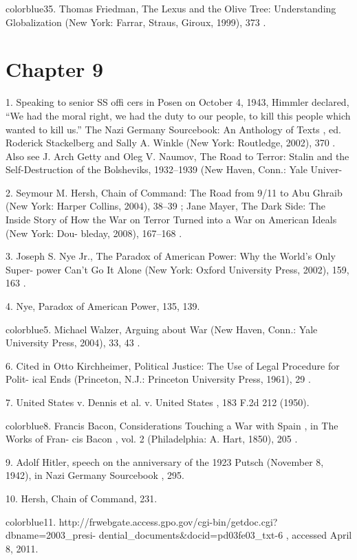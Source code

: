 	{color{blue}35}. Thomas Friedman, The Lexus and the Olive Tree: Understanding Globalization (New York: Farrar, Straus, Giroux, 1999), 373 .


\section{Chapter 9}


	{\color{blue}1}. Speaking to senior SS offi cers in Posen on October 4, 1943, Himmler declared, “We had the moral right, we had the duty to our people, to kill this people which wanted to kill us.” The Nazi Germany Sourcebook: An Anthology of Texts , ed. Roderick Stackelberg and Sally A. Winkle (New York: Routledge, 2002), 370 . Also see J. Arch Getty and Oleg V. Naumov, The Road to Terror: Stalin and the Self-Destruction of the Bolsheviks, 1932–1939 (New Haven, Conn.: Yale Univer-


	{\color{blue}2}. Seymour M. Hersh, Chain of Command: The Road from 9/11 to Abu Ghraib (New York: Harper Collins, 2004), 38–39 ; Jane Mayer, The Dark Side: The Inside Story of How the War on Terror Turned into a War on American Ideals (New York: Dou- bleday, 2008), 167–168 .


	{\color{blue}3}. Joseph S. Nye Jr., The Paradox of American Power: Why the World’s Only Super- power Can’t Go It Alone (New York: Oxford University Press, 2002), 159, 163 .


	{\color{blue}4}. Nye, Paradox of American Power, 135, 139.


	{color{blue}5}. Michael Walzer, Arguing about War (New Haven, Conn.: Yale University Press, 2004), 33, 43 .


	{\color{blue}6}. Cited in Otto Kirchheimer, Political Justice: The Use of Legal Procedure for Polit- ical Ends (Princeton, N.J.: Princeton University Press, 1961), 29 .


	{\color{blue}7}. United States v. Dennis et al. v. United States , 183 F.2d 212 (1950).


	{color{blue}8}. Francis Bacon, Considerations Touching a War with Spain , in The Works of Fran- cis Bacon , vol. 2 (Philadelphia: A. Hart, 1850), 205 .


	{\color{blue}9}. Adolf Hitler, speech on the anniversary of the 1923 Putsch (November 8, 1942), in Nazi Germany Sourcebook , 295.


	{\color{blue}10}. Hersh, Chain of Command, 231.


	{color{blue}11}. http://frwebgate.access.gpo.gov/cgi-bin/getdoc.cgi?dbname=2003_presi- dential_documents&docid=pd03fe03_txt-6 , accessed April 8, 2011.



